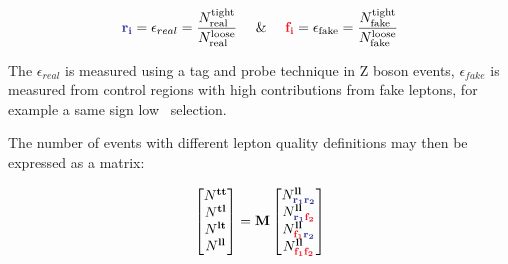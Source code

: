 \begin{equation}
	\textcolor{Blue}{\mathbf{r_i}} = \epsilon_{real} = \frac{  N^{\text{tight}}_{\text{real}} }{ N^{\text{loose}}_{\text{real}} }~~~~\&~~~~\textcolor{Red}{\mathbf{f_i}} = \epsilon_{\text{fake}} = \frac{ N^{\text{tight}}_{\text{fake}} }{ N^{\text{loose}}_{\text{fake}}}
	\label{eq:fake_eff}	
\end{equation}

The $\epsilon_{real}$ is measured using a tag and probe technique in Z boson events, $\epsilon_{fake}$ is measured from control regions with high contributions from fake leptons, for example a same sign low \etmiss\ selection. 

The number of events with different lepton quality definitions may then be expressed as a matrix:

\begin{equation}
\begin{bmatrix}
N^{\mathbf{tt}} \\
N^{\mathbf{t}\mathbf{l}} \\
N^{\mathbf{l}\mathbf{t}} \\
N^{\mathbf{ll}} \\
\end{bmatrix} 
= \mathbf{M}
\begin{bmatrix}


N^{\mathbf{ll}}_{\rone\rtwo}\\
N^{\mathbf{ll}}_{\rone\ftwo}\\
N^{\mathbf{ll}}_{\fone\rtwo}\\
N^{\mathbf{ll}}_{\fone\ftwo}\\
\end{bmatrix}
\label{eq:fake}
\end{equation}

